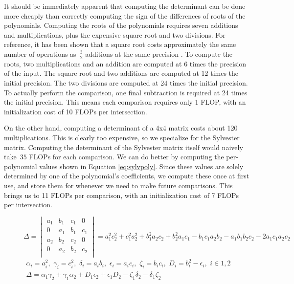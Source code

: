 \documentclass{cccg16}
\begin{document}
It should be immediately apparent that computing the determinant can
be done more cheaply than correctly computing the sign of the
differences of roots of the polynomials.  Computing the roots of the
polynomials requires seven additions and multiplications, plus the
expensive square root and two divisions.  For reference, it has been
shown that a square root costs approximately the same number of
operations as~$\frac{3}{2}$ additions at the same precision
\cite{karatsuba}.  To compute the roots, two multiplications and an
addition are computed at 6 times the precision of the input.  The
square root and two additions are computed at 12 times the initial
precision.  The two divisions are computed at 24 times the initial
precision.  To actually perform the comparison, one final subtraction
is required at 24 times the initial precision. This means each
comparison requires only 1 FLOP, with an initialization cost of 10
FLOPs per intersection.

On the other hand, computing a determinant of a 4x4 matrix costs about
120 multiplications.  This is clearly too expensive, so we specialize
for the Sylvester matrix.  Computing the determinant of the Sylvester
matrix itself would naively take~$35$ FLOPs for each comparison.  We
can do better by computing the per-polynomial values shown in Equation
\ref{eq:sylvpoly}.  Since these values are solely determined by one of
the polynomial's coefficients, we compute these once at first use, and
store them for whenever we need to make future comparisons.  This
brings us to 11 FLOPs per comparison, with an initialization cost of 7
FLOPs per intersection.

\begin{figure}
  \begin{equation*}
    \Delta=\begin{vmatrix}
    a_1 & b_1 & c_1 & 0\\
    0 & a_1 & b_1 & c_1\\
    a_2 & b_2 & c_2 & 0\\
    0 & a_2 & b_2 & c_2\\
    \end{vmatrix}=
    a_1^2 c_2^2 + c_1^2 a_2^2 + b_1^2 a_2 c_2 + b_2^2 a_1 c_1 -
    b_1 c_1 a_2 b_2 - a_1 b_1 b_2 c_2 - 2 a_1 c_1 a_2 c_2
  \end{equation*}
  \begin{align}
    \alpha_i=a_i^2,\,\, \gamma_i=c_i^2,\,\,
    \delta_i=a_i b_i,\,\, \epsilon_i=a_i c_i,\,\, \zeta_i=b_i c_i,\,\,
    D_i=b_i^2-\epsilon_i,\,\,
    i\in {1, 2}\\
    \Delta = \alpha_1 \gamma_2 + \gamma_1 \alpha_2 +
    D_1 \epsilon_2 + \epsilon_1 D_2 - \zeta_1 \delta_2 -
    \delta_1 \zeta_2
  \label{eq:sylvpoly}
  \end{align}
\end{figure}
\end{document}
